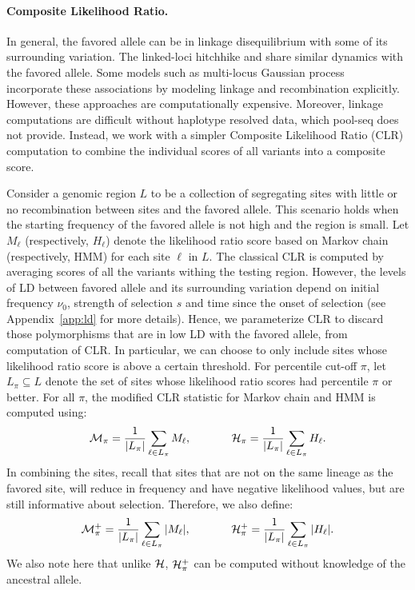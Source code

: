 \paragraph{Composite Likelihood Ratio.}
In general, the favored allele can be in linkage disequilibrium with
some of its surrounding variation. The linked-loci hitchhike and share
similar dynamics with the favored allele.  Some models such as
multi-locus Gaussian process~\cite{Terhorst2015Multi} incorporate
these associations by modeling linkage and recombination
explicitly. However, these approaches are computationally
expensive. Moreover, linkage computations are difficult without
haplotype resolved data, which pool-seq does not provide. Instead, we
work with a simpler Composite Likelihood Ratio
(CLR)~\cite{nielsen2005genomic,williamson2007localizing} computation
to combine the individual scores of all variants into a composite
score.


Consider a genomic region $L$ to be a collection of segregating sites
with little or no recombination between sites and the favored
allele. This scenario holds when the starting frequency of the favored
allele is not high and the region is small. Let $M_\ell$
(respectively, $H_\ell$) denote the likelihood ratio score based on
Markov chain (respectively, HMM) for each site $\ell$ in $L$. The
classical CLR is computed by averaging scores of all the variants
withing the testing region.  However, the levels of LD between favored
allele and its surrounding variation depend on initial frequency
$\nu_0$, strength of selection $s$ and time since the onset of
selection (see Appendix~\ref{app:ld} for more details).  Hence, we
parameterize CLR to discard those polymorphisms that are in low LD
with the favored allele, from computation of CLR.  In particular, we
can choose to only include sites whose likelihood ratio score is above
a certain threshold. For percentile cut-off $\pi$, let
$L_{\pi}\subseteq L$ denote the set of sites whose likelihood ratio
scores had percentile $\pi$ or better. For all $\pi$, the modified CLR
statistic for Markov chain and HMM is computed using: 
\begin{equation}
 {\cal M}_{\pi} = \frac{1}{|L_{\pi}|}\sum_{\ell \in L_{\pi}}M_\ell,
\hspace{0.5in}
 {\cal H}_{\pi} = \frac{1}{|L_{\pi}|}\sum_{\ell \in L_{\pi}} H_\ell.
\label{eq:pihmm}
\end{equation}
In combining the sites, recall that sites that are not on the same
lineage as the favored site, will reduce in frequency and have
negative likelihood values, but are still informative about
selection. Therefore, we also define:
\begin{equation}
 {\cal M}^{+}_{\pi} = \frac{1}{|L_{\pi}|}\sum_{\ell \in L_{\pi}}\vert M_\ell\vert ,
\hspace{0.5in}
 {\cal H}^{+}_{\pi} = \frac{1}{|L_{\pi}|}\sum_{\ell \in L_{\pi}}\vert H_\ell\vert.
\label{eq:pihmmplus}
\end{equation}
We also note here that unlike ${\cal H}$, ${\cal H}^{+}_{\pi}$ can be computed
without knowledge of the ancestral allele.
